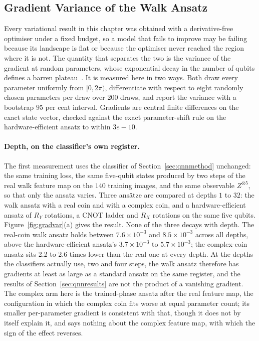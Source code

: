 \subsection{Gradient Variance of the Walk Ansatz}
\label{sec:gradvar}

Every variational result in this chapter was obtained with a derivative-free
optimiser under a fixed budget, so a model that fails to improve may be
failing because its landscape is flat or because the optimiser never reached
the region where it is not. The quantity that separates the two is the
variance of the gradient at random parameters, whose exponential decay in the
number of qubits defines a barren plateau~\cite{McClean_2018, Larocca_2025}.
It is measured here in two ways. Both draw every parameter uniformly from
$[0, 2\pi)$, differentiate with respect to eight randomly chosen parameters
per draw over 200 draws, and report the variance with a bootstrap
$95$ per cent interval. Gradients are central finite differences on the exact
state vector, checked against the exact parameter-shift rule on the
hardware-efficient ansatz to within $3e-10$.

\paragraph*{Depth, on the classifier's own register.}
The first measurement uses the classifier of Section~\ref{sec:qnnmethod}
unchanged: the same training loss, the same five-qubit states produced by two
steps of the real walk feature map on the $140$ training images, and the same
observable $Z^{\otimes 5}$, so that only the ansatz varies. Three ansätze
are compared at depths $1$ to $32$: the walk ansatz with a real coin and with
a complex coin, and a hardware-efficient ansatz of $R_Y$ rotations, a CNOT
ladder and $R_X$ rotations on the same five qubits.
Figure~\ref{fig:gradvar}(a) gives the result. None of the three decays with
depth. The real-coin walk ansatz holds between $7.6 \times 10^{-3}$ and
$8.5 \times 10^{-3}$ across all depths, above the hardware-efficient ansatz's
$3.7 \times 10^{-3}$ to $5.7 \times 10^{-3}$; the complex-coin ansatz sits
2.2 to 2.6 times lower than the real one at every
depth. At the depths the classifiers actually use, two and four steps, the
walk ansatz therefore has gradients at least as large as a standard ansatz on
the same register, and the results of Section~\ref{sec:qnnresults} are not
the product of a vanishing gradient. The complex arm here is the trained-phase
ansatz after the real feature map, the configuration in which the complex coin
fits worse at equal parameter count; its smaller per-parameter gradient is
consistent with that, though it does not by itself explain it, and says
nothing about the complex feature map, with which the sign of the effect
reverses.

